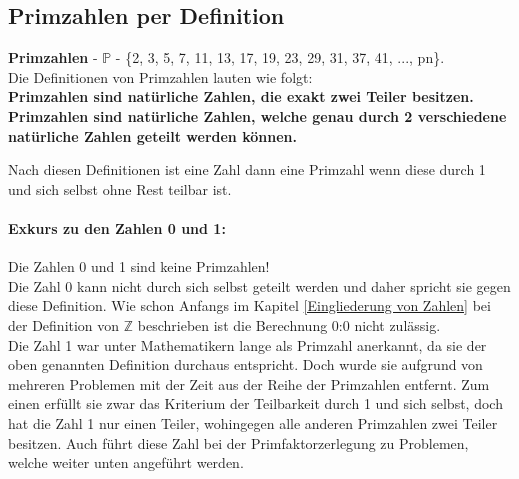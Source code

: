 \documentclass[german,12pt,a4paper]{article}
\begin{document}
\subsection{Primzahlen per Definition}\label{Primzahlen per Definition}
\textbf{Primzahlen} - $\mathbb{P}$ - \{2, 3, 5, 7, 11, 13, 17, 19, 23, 29, 31, 37, 41, ..., pn\}.\\
Die Definitionen von Primzahlen lauten wie folgt:\\
\hspace*{5mm}\textbf{Primzahlen sind natürliche Zahlen, die exakt zwei Teiler besitzen.}\\
\hspace*{5mm}\textbf{Primzahlen sind natürliche Zahlen, welche genau durch 2 verschiedene natürliche Zahlen geteilt werden können.}

Nach diesen Definitionen ist eine Zahl dann eine Primzahl wenn diese durch 1 und sich selbst ohne Rest teilbar ist.
\paragraph{Exkurs zu den Zahlen 0 und 1:}Die Zahlen 0 und 1 sind keine Primzahlen!\\
Die Zahl 0 kann nicht durch sich selbst geteilt werden und daher spricht sie gegen diese Definition.
Wie schon Anfangs im Kapitel \ref{Eingliederung von Zahlen} bei der Definition von $\mathbb{Z}$ beschrieben ist die Berechnung 0:0 nicht zulässig.\\
Die Zahl 1 war unter Mathematikern lange als Primzahl anerkannt, da sie der oben genannten Definition durchaus entspricht.
Doch wurde sie aufgrund von mehreren Problemen mit der Zeit aus der Reihe der Primzahlen entfernt.
Zum einen erfüllt sie zwar das Kriterium der Teilbarkeit durch 1 und sich selbst, doch hat die Zahl 1 nur einen Teiler, wohingegen alle anderen Primzahlen zwei Teiler besitzen.
Auch führt diese Zahl bei der Primfaktorzerlegung zu Problemen, welche weiter unten angeführt werden.
\end{document}
